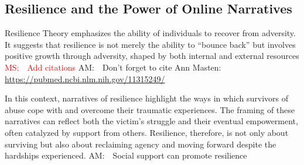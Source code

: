 \documentclass[11pt]{article}
\newcommand{\ms}[1]{\textcolor{red}{{MS:~~#1}}}
\newcommand{\am}[1]{\textcolor{red!80!black!40}{{AM:~~#1}}}
\begin{document}




\subsection{Resilience and the Power of Online Narratives} 

Resilience Theory emphasizes the ability of individuals to recover from adversity.
It suggests that resilience is not merely the ability to ``bounce back'' but involves positive growth through adversity, shaped by both internal and external resources \ms{Add citations}
\am{Don't forget to cite Ann Masten: \url{https://pubmed.ncbi.nlm.nih.gov/11315249/}}

In this context, narratives of resilience highlight the ways in which survivors of abuse cope with and overcome their traumatic experiences. 
The framing of these narratives can reflect both the victim's struggle and their eventual empowerment, often catalyzed by support from others. 
Resilience, therefore, is not only about surviving but also about reclaiming agency and moving forward despite the hardships experienced. 
\am{Social support can promote resilience} 
\end{document}
